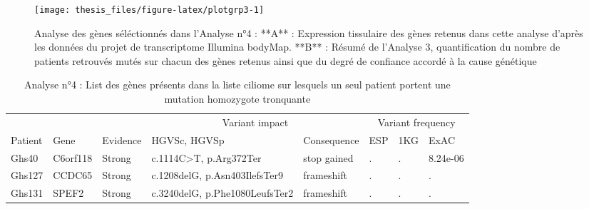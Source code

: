 \documentclass[12pt,twoside]{reedthesis}
\theoremstyle{definition}
\theoremstyle{definition}
\theoremstyle{remark}
\begin{document}
  \newpage  
  
  \begin{figure}
  
  {\centering \texttt{[image: thesis\_files/figure-latex/plotgrp3-1]} 
  
  }
  
  \caption[Analyse des gènes séléctionnés dans l'Analyse n°4]{Analyse des gènes séléctionnés dans l'Analyse n°4 : **A** : Expression tissulaire des gènes retenus dans cette analyse d'après les données du projet de transcriptome Illumina bodyMap. **B** : Résumé de l'Analyse 3, quantification du nombre de patients retrouvés mutés sur chacun des gènes retenus ainsi que du degré de confiance accordé à la cause génétique}\label{fig:plotgrp3}
  \end{figure}
  
  \newpage
  
  \begin{landscape}
  \begin{longtable}[t]{llllllll}
  \caption{\label{tab:tabgrp3high}Analyse n°4 : List des gènes présents dans la liste ciliome sur lesquels un seul patient portent une mutation homozygote tronquante}\\
  \toprule
  \multicolumn{1}{c}{ } & \multicolumn{1}{c}{ } & \multicolumn{1}{c}{ } & \multicolumn{2}{c}{Variant impact} & \multicolumn{3}{c}{Variant frequency} \\
  \cmidrule(l{2pt}r{2pt}){4-5} \cmidrule(l{2pt}r{2pt}){6-8}
  Patient & Gene & Evidence & HGVSc, HGVSp & Consequence & ESP & 1KG & ExAC\\
  \midrule
  Ghs40 & C6orf118 & Strong & c.1114C>T, p.Arg372Ter & stop gained & . & . & 8.24e-06\\
  Ghs127 & CCDC65 & Strong & c.1208delG, p.Asn403IlefsTer9 & frameshift & . & . & .\\
  Ghs131 & SPEF2 & Strong & c.3240delG, p.Phe1080LeufsTer2 & frameshift & . & . & .\\
  \bottomrule
  \end{longtable}
  \end{landscape}
  
\end{document}
